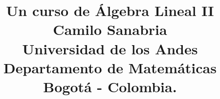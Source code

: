 \documentclass{book}
\title{{\Huge Un curso de \'Algebra Lineal II}\\
\vspace{2cm}
Camilo Sanabria\\
\vspace{1cm}
Universidad de los Andes\\
Departamento de Matem\'aticas\\
Bogot\'a - Colombia.
}
\date{}
\begin{document}
\frontmatter
\maketitle
\tableofcontents
\listoffigures 

\mainmatter

\theoremstyle{plain} \newtheorem{teo}{Teorema}[chapter]
\theoremstyle{plain} \newtheorem{pro}[teo]{Propiedad}
\theoremstyle{plain} \newtheorem{prop}[teo]{Proposici\'on}
\theoremstyle{plain} \newtheorem{coro}[teo]{Corolario}
\theoremstyle{plain} \newtheorem{lema}[teo]{Lema}
\theoremstyle{definition} \newtheorem{defn}[teo]{Definici\'on}
\theoremstyle{definition} \newtheorem{obs}[teo]{Observaci\'on}
\theoremstyle{definition} \newtheorem{nota}[teo]{Notaci\'on}
\theoremstyle{definition} \newtheorem{ejem}[teo]{Ejemplo}

\newcommand{\dem}{\noindent\emph{Dem}. }











\backmatter
%
%
\printindex
\end{document}
